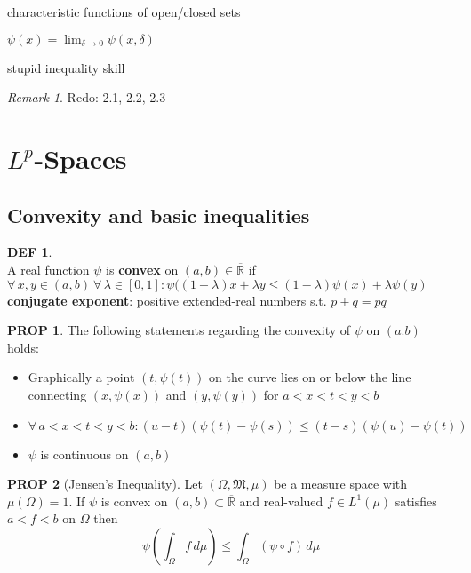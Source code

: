\documentclass[hidelinks,10pt]{article}
\theoremstyle{definition}
\newtheorem*{defin}{DEF}
\theoremstyle{dotles}
\newenvironment{exercise}[1]
  {\renewcommand\theinnercustomex{#1}\innercustomex}
  {\endinnercustomex}
\theoremstyle{dotless}
\newtheorem{proposition}{PROP}[section]
\theoremstyle{remark}
\newtheorem*{remark}{Remark}
\begin{document}
\begin{exercise}{2.1}
characteristic functions of open/closed sets
\end{exercise}

\begin{exercise}{2.2}
$\psi(x)=\lim_{\delta\to0}\psi(x,\delta)$
\end{exercise}

\begin{exercise}{2.3}
stupid inequality skill
\end{exercise}

\begin{remark}
Redo: 2.1, 2.2, 2.3
\end{remark}

\newpage

\section{$L^p$-Spaces}

\subsection{Convexity and basic inequalities}

\begin{defin}~\\
A real function $\psi$ is \textbf{convex} on $(a,b)\in\overline{\mathbb{R}}$ if $\forall\,x,y\in(a,b)\ \forall\,\lambda\in[0,1]:\psi((1-\lambda)x+\lambda y\leq(1-\lambda)\psi(x)+\lambda\psi(y)$\bigbreak
\textbf{conjugate exponent}: positive extended-real numbers s.t. $p+q=pq$
\end{defin}

\begin{proposition}
The following statements regarding the convexity of $\psi$ on $(a.b)$ holds:\begin{itemize}
    \item Graphically a point $(t,\psi(t))$ on the curve lies on or below the line connecting $(x,\psi(x))$ and $(y,\psi(y))$ for $a<x<t<y<b$
    \item $\forall\,a<x<t<y<b:(u-t)(\psi(t)-\psi(s))\leq(t-s)(\psi(u)-\psi(t))$
    \item $\psi$ is continuous on $(a,b)$
\end{itemize}
\end{proposition}

\begin{proposition}[Jensen's Inequality]
Let $(\Omega,\mathfrak{M},\mu)$ be a measure space with $\mu(\Omega)=1$. If $\psi$ is convex on $(a,b)\subset\overline{\mathbb{R}}$ and real-valued $f\in L^1(\mu)$ satisfies $a<f<b$ on $\Omega$ then
\[\psi\left(\int_\Omega f\,d\mu\right)\leq\int_\Omega(\psi\circ f)\,d\mu\]
\end{proposition}
\end{document}
